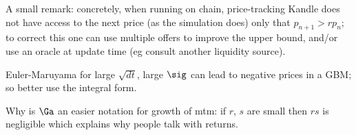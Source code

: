 \documentclass[oneside,12pt]{article}
\begin{document}
A small remark: concretely, when running on chain, price-tracking Kandle does not have access to the next price (as the simulation does)
only that $p_{n+1}>r p_n$;
to correct this one can use multiple offers to improve the upper bound,
and/or use an oracle at update time (eg consult another liquidity source).

Euler-Maruyama for large $\sqrt{dt}$, large $\sig$ can lead to negative prices in a GBM;
so better use the integral form. 


Why is $\Ga$ an easier notation for growth of mtm:
if $r$, $s$ are small then $rs$ is negligible which explains why people talk with returns.



\end{document}
